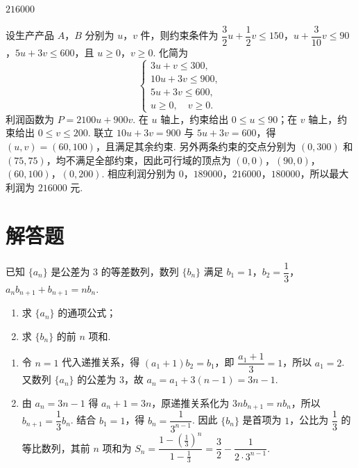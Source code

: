 \begin{answer}
\(216000\)
\end{answer}

\begin{solution}
设生产产品 \(A\)，\(B\) 分别为 \(u\)，\(v\) 件，则约束条件为 \(\dfrac32u+\dfrac12v\le150\)，\(u+\dfrac3{10}v\le90\)，\(5u+3v\le600\)，且 \(u\ge0\)，\(v\ge0\). 化简为
\[
\begin{cases}
3u+v\le300,\\
10u+3v\le900,\\
5u+3v\le600,\\
u\ge0,\quad v\ge0.
\end{cases}
\]
利润函数为 \(P=2100u+900v\). 在 \(u\) 轴上，约束给出 \(0\le u\le90\)；在 \(v\) 轴上，约束给出 \(0\le v\le200\). 联立 \(10u+3v=900\) 与 \(5u+3v=600\)，得 \((u,v)=(60,100)\)，且满足其余约束. 另外两条约束的交点分别为 \((0,300)\) 和 \((75,75)\)，均不满足全部约束，因此可行域的顶点为 \((0,0)\)，\((90,0)\)，\((60,100)\)，\((0,200)\). 相应利润分别为 \(0\)，\(189000\)，\(216000\)，\(180000\)，所以最大利润为 \(216000\) 元.
\end{solution}

\section{解答题}

\begin{problem}
已知 \(\{a_n\}\) 是公差为 \(3\) 的等差数列，数列 \(\{b_n\}\) 满足 \(b_1=1\)，\(b_2=\dfrac13\)，\(a_nb_{n+1}+b_{n+1}=nb_n\).

\begin{enumerate}
\item 求 \(\{a_n\}\) 的通项公式；
\item 求 \(\{b_n\}\) 的前 \(n\) 项和.
\end{enumerate}
\end{problem}

\begin{solution}
\begin{enumerate}
\item 令 \(n=1\) 代入递推关系，得 \((a_1+1)b_2=b_1\)，即 \(\dfrac{a_1+1}{3}=1\)，所以 \(a_1=2\). 又数列 \(\{a_n\}\) 的公差为 \(3\)，故 \(a_n=a_1+3(n-1)=3n-1\).
\item 由 \(a_n=3n-1\) 得 \(a_n+1=3n\)，原递推关系化为 \(3n b_{n+1}=n b_n\)，所以 \(b_{n+1}=\dfrac13b_n\). 结合 \(b_1=1\)，得 \(b_n=\dfrac{1}{3^{n-1}}\). 因此 \(\{b_n\}\) 是首项为 \(1\)，公比为 \(\dfrac13\) 的等比数列，其前 \(n\) 项和为 \(S_n=\dfrac{1-(\frac13)^n}{1-\frac13}=\dfrac32-\dfrac{1}{2\cdot3^{n-1}}\).
\end{enumerate}
\end{solution}

